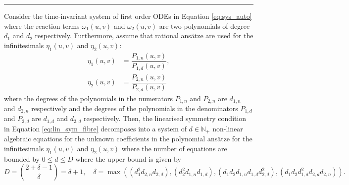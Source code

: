 \hrule
\begin{theorem}
  Consider the time-invariant system of first order ODEs in Equation \eqref{eq:sys_auto} where the reaction terms $\omega_1(u,v)$ and $\omega_2(u,v)$ are two polynomials of degree $d_1$ and $d_2$ respectively. Furthermore, assume that rational ans\"atze are used for the infinitesimals $\eta_1(u,v)$ and $\eta_2(u,v)$:
  \begin{align}
    \eta_1(u,v)&=\dfrac{P_{1,n}(u,v)}{P_{1,d}(u,v)},\label{eq:ansatz_1}\\
    \eta_2(u,v)&=\dfrac{P_{2,n}(u,v)}{P_{2,d}(u,v)}\label{eq:ansatz_2}    
   \end{align}
where the degrees of the polynomials in the numerators $P_{1,n}$ and $P_{2,n}$ are $d_{1,n}$ and $d_{2,n}$ respectively and the degrees of the polynomials in the denominators $P_{1,d}$ and $P_{2,d}$ are $d_{1,d}$ and $d_{2,d}$ respectively. Then, the linearised symmetry condition in Equation \eqref{eq:lin_sym_fibre} decomposes into a system of $d\in\mathbb{N}_+$ non-linear algebraic equations for the unknown coefficients in the polynomial ans\"atze for the infinitesimals $\eta_1(u,v)$ and $\eta_2(u,v)$ where the number of equations are bounded by $0\leq d\leq D$ where the upper bound is given by
  \begin{equation}
    D={2+\delta-1\choose \delta}=\delta+1,\quad\delta=\max\left((d_1^2 d_{2,n} d_{2,d}),(d_2^2d_{1,n}d_{1,d}),(d_1d_2d_{1,n}d_{1,d}d_{2,d}^2),(d_1d_2d_{1,d}^2d_{2,d}d_{2,n})\right).
    \label{eq:num_monomials}
    \end{equation}

\label{thm:lin_sym_cond_fibre_phase_plane_polynomial}
\end{theorem}
\dotfill
